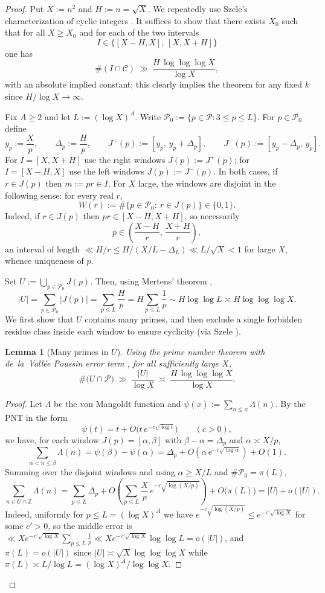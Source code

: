 \documentclass[12pt]{article}
\renewcommand{\tag}[1]{}
\newtheorem{lemma}{Lemma}[theorem]
\theoremstyle{remark}
\begin{document}
\begin{proof}
Put $X:=n^2$ and $H:=n=\sqrt X$. We repeatedly use Szele's characterization of cyclic integers \cite{Szele1947}. It suffices to show that there exists $X_0$ such that for all $X\ge X_0$ and for each of the two intervals
$$
I\in\{[X-H,X],\,[X,X+H]\}
$$
one has
$$
\#(I\cap\mathcal C)\ \gg\ \frac{H\,\log\log\log X}{\log X},
$$
with an absolute implied constant; this clearly implies the theorem for any fixed $k$ since $H/\log X\to\infty$.

Fix $A\ge2$ and let $L:=(\log X)^A$. Write $\mathcal P_0:=\{p\in\mathcal P:3\le p\le L\}$. For $p\in\mathcal P_0$ define
$$
 y_p:=\frac{X}{p},\qquad \Delta_p:=\frac{H}{p},\qquad J^+(p):=[y_p,\,y_p+\Delta_p],\qquad J^-(p):=[y_p-\Delta_p,\,y_p].
$$
For $I=[X,X+H]$ use the right windows $J(p):=J^+(p)$; for $I=[X-H,X]$ use the left windows $J(p):=J^-(p)$. In both cases, if $r\in J(p)$ then $m:=pr\in I$. For $X$ large, the windows are disjoint in the following sense: for every real $r$,
$$
W(r):=\#\{p\in\mathcal P_0:\ r\in J(p)\}\in\{0,1\}.
$$
Indeed, if $r\in J(p)$ then $pr\in[X-H,X+H]$, so necessarily
$$
p\in\left(\frac{X-H}{r},\,\frac{X+H}{r}\right),
$$
an interval of length $\ll H/r\le H/(X/L-\Delta_L)\ll L/\sqrt X<1$ for large $X$, whence uniqueness of $p$.

Set $U:=\bigcup_{p\in\mathcal P_0} J(p)$. Then, using Mertens' theorem \cite{Apostol1976,MV2007},
$$
|U|=\sum_{p\in\mathcal P_0}|J(p)|=\sum_{p\le L}\frac{H}{p}
 = H\sum_{p\le L}\frac1p\sim H\log\log L\asymp H\log\log\log X.\tag{1}
$$
We first show that $U$ contains many primes, and then exclude a single forbidden residue class inside each window to ensure cyclicity (via Szele \cite{Szele1947}).

\begin{lemma}[Many primes in $U$]\label{lem:many-primes-U}
Using the prime number theorem with de~la~Vall\'ee Poussin error term \cite{MV2007,IK2004}, for all sufficiently large $X$,
$$
\#\bigl(U\cap\mathcal P\bigr)\ \gg\ \frac{|U|}{\log X}\ \asymp\ \frac{H\,\log\log\log X}{\log X}.\tag{2}
$$
\end{lemma}

\begin{proof}
Let $\Lambda$ be the von Mangoldt function and $\psi(x):=\sum_{n\le x}\Lambda(n)$. By the PNT in the form
$$
\psi(t)=t+O\bigl(t\,e^{-c\sqrt{\log t}}\bigr)\qquad (c>0),
$$
we have, for each window $J(p)=[\alpha,\beta]$ with $\beta-\alpha=\Delta_p$ and $\alpha\asymp X/p$,
$$
\sum_{\alpha<n\le\beta}\Lambda(n)
= \psi(\beta)-\psi(\alpha)
= \Delta_p + O\!\left(\alpha\,e^{-c\sqrt{\log \alpha}}\right) + O(1).
$$
Summing over the disjoint windows and using $\alpha\ge X/L$ and $\#\mathcal P_0=\pi(L)$,
$$
\sum_{n\in U\cap\mathbb Z}\Lambda(n)
= \sum_{p\le L}\Delta_p + O\!\left(\sum_{p\le L}\frac{X}{p}\,e^{-c\sqrt{\log(X/p)}}\right)+O\bigl(\pi(L)\bigr)
= |U| + o(|U|).
$$
Indeed, uniformly for $p\le L=(\log X)^A$ we have $e^{-c\sqrt{\log(X/p)}}\le e^{-c'\sqrt{\log X}}$ for some $c'>0$, so the middle error is $\ll X e^{-c'\sqrt{\log X}}\sum_{p\le L}\tfrac1p\ll X e^{-c'\sqrt{\log X}}\log\log L=o(|U|)$, and $\pi(L)=o(|U|)$ since $|U|\asymp \sqrt X\log\log\log X$ while $\pi(L)\asymp L/\log L=(\log X)^A/\log\log X$.


\end{proof}
\end{proof}
\end{document}
